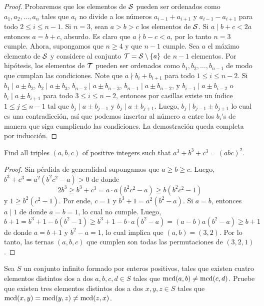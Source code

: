 \begin{proof}
	Probaremos que los elementos de $\cal S$ pueden ser ordenados como $a_1,a_2,\dots,a_n$ tales que $a_i$ no divide a los números $a_{i-1}+a_{i+1}$ y $a_{i-1}-a_{i+1}$ para todo $2\le i\le n-1$. Si $n=3$, sean $a>b>c$ los elementos de $\cal S$. Si $a\mid b+c<2a$ entonces $a=b+c$, absurdo. Es claro que $a\nmid b-c<a$, por lo tanto $n=3$ cumple. Ahora, supongamos que $n\ge 4$ y que $n-1$ cumple. Sea $a$ el máximo elemento de $\cal S$ y considere al conjunto ${\cal T}={\cal S}\setminus\{a\}$ de $n-1$ elementos. Por hipótesis, los elementos de $\cal T$ pueden ser ordenados como $b_1,b_2,\dots,b_{n-1}$ de modo que cumplan las condiciones. Note que $a\nmid b_i+b_{i+1}$ para todo $1\le i\le n-2$. Si $b_1\mid a\pm b_2$, $b_2\mid a\pm b_3$, $b_{n-2}\mid a\pm b_{n-3}$, $b_{n-1}\mid a\pm b_{n-2}$, y $b_{i-1}\mid a\pm b_{i-2}$ o $b_i\mid a\pm b_{i+1}$ para todo $3\le i\le n-2$, entonces por casillas existe un índice $1\le j\le n-1$ tal que $b_j\mid a\pm b_{j-1}$ y $b_j\mid a\pm b_{j+1}$. Luego, $b_j\mid b_{j-1}\pm b_{j+1}$ lo cual es una contradicción, así que podemos insertar al número $a$ entre los $b_i$'s de manera que siga cumpliendo las condiciones. La demostración queda completa por inducción.
\end{proof}

\begin{probEG}[ISL 2019/N2]
	Find all triples $(a,b,c)$ of positive integers such that $a^3+b^3+c^3=(abc)^2$.
\end{probEG}

\begin{proof}
	Sin pérdida de generalidad supongamos que $a\ge b\ge c$. Luego, $b^3+c^3=a^2(b^2c^2-a)>0$ de donde
	\[2b^3\ge b^3+c^3=a\cdot a(b^2c^2-a)\ge b(b^2c^2-1)\]
	y $1\ge b^2(c^2-1)$. Por ende, $c=1$ y $b^3+1=a^2(b^2-a)$. Si $a=b$, entonces $a\mid 1$ de donde $a=b=1$, lo cual no cumple. Luego,
	\[b+1=b^3+1-b(b^2-1)\ge b^3+1-b\cdot a(b^2-a)=(a-b)a(b^2-a)\ge b+1\]
	de donde $a=b+1$ y $b^2-a=1$, lo cual implica que $(a,b)=(3,2)$. Por lo tanto, las ternas $(a,b,c)$ que cumplen son todas las permutaciones de $(3,2,1)$.
\end{proof}


\begin{probEG}
	Sea $S$ un conjunto infinito formado por enteros positivos, tales que existen cuatro elementos distintos dos a dos $a,b,c,d\in S$ tales que $\operatorname{mcd}(a,b)\ne\operatorname{mcd}(c,d)$. Pruebe que existen tres elementos distintos dos a dos $x,y,z\in S$ tales que $\operatorname{mcd}(x,y)=\operatorname{mcd}(y,z)\ne\operatorname{mcd}(z,x)$.
\end{probEG}

